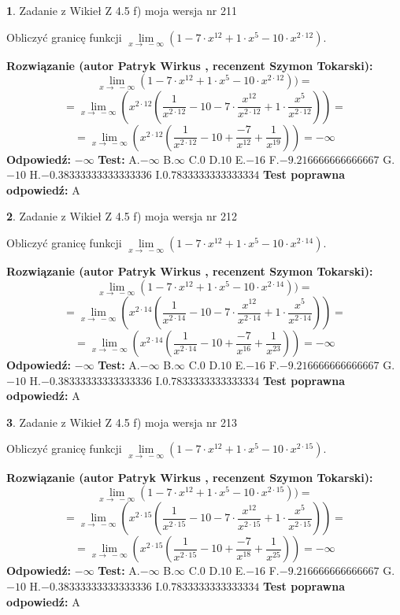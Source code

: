 \documentclass[12pt, a4paper]{article}
\theoremstyle{definition} %
\newtheorem{zad}{}
\newcommand{\zadStart}[1]{\begin{zad}#1\newline}
\newcommand{\zadStop}{\end{zad}}
\newcommand{\rozwStart}[2]{\noindent \textbf{Rozwiązanie (autor #1 , recenzent #2): }\newline}
\newcommand{\rozwStop}{\newline}
\newcommand{\odpStart}{\noindent \textbf{Odpowiedź:}\newline}
\newcommand{\odpStop}{\newline}
\newcommand{\testStart}{\noindent \textbf{Test:}\newline}
\newcommand{\testStop}{\newline}
\newcommand{\kluczStart}{\noindent \textbf{Test poprawna odpowiedź:}\newline}
\newcommand{\kluczStop}{\newline}
\begin{document}
\zadStart{Zadanie z Wikieł Z 4.5 f) moja wersja nr 211}


Obliczyć granicę funkcji  $\lim\limits_{x\to\ -\infty}(1 - 7 \cdot x^{12}+1 \cdot x^{5}- 10 \cdot x^{2\cdot12})$.
\zadStop
\rozwStart{Patryk Wirkus}{Szymon Tokarski}
$$\lim\limits_{x\to\ -\infty}(1 - 7 \cdot x^{12}+1 \cdot x^{5}- 10 \cdot x^{2\cdot12}))=$$
$$=\lim\limits_{x\to\ -\infty}(x^{2\cdot12}(\frac{1}{x^{2\cdot12}}-10 -7 \cdot \frac{x^{12}}{x^{2\cdot12}}+1 \cdot \frac{x^{5}}{x^{2\cdot12}}))=$$
$$=\lim\limits_{x\to\ -\infty}(x^{2\cdot12}(\frac{1}{x^{2\cdot12}}-10 + \frac{-7}{x^{12}}+ \frac{1}{x^{19}}))=-\infty$$
\rozwStop
\odpStart
$-\infty$
\odpStop
\testStart
A.$-\infty$ B.$\infty$ C.$0$ D.$10$ E.$-16$
F.$-9.216666666666667$ G.$-10$
H.$-0.38333333333333336$
I.$0.7833333333333334$
\testStop
\kluczStart
A
\kluczStop



\zadStart{Zadanie z Wikieł Z 4.5 f) moja wersja nr 212}


Obliczyć granicę funkcji  $\lim\limits_{x\to\ -\infty}(1 - 7 \cdot x^{12}+1 \cdot x^{5}- 10 \cdot x^{2\cdot14})$.
\zadStop
\rozwStart{Patryk Wirkus}{Szymon Tokarski}
$$\lim\limits_{x\to\ -\infty}(1 - 7 \cdot x^{12}+1 \cdot x^{5}- 10 \cdot x^{2\cdot14}))=$$
$$=\lim\limits_{x\to\ -\infty}(x^{2\cdot14}(\frac{1}{x^{2\cdot14}}-10 -7 \cdot \frac{x^{12}}{x^{2\cdot14}}+1 \cdot \frac{x^{5}}{x^{2\cdot14}}))=$$
$$=\lim\limits_{x\to\ -\infty}(x^{2\cdot14}(\frac{1}{x^{2\cdot14}}-10 + \frac{-7}{x^{16}}+ \frac{1}{x^{23}}))=-\infty$$
\rozwStop
\odpStart
$-\infty$
\odpStop
\testStart
A.$-\infty$ B.$\infty$ C.$0$ D.$10$ E.$-16$
F.$-9.216666666666667$ G.$-10$
H.$-0.38333333333333336$
I.$0.7833333333333334$
\testStop
\kluczStart
A
\kluczStop



\zadStart{Zadanie z Wikieł Z 4.5 f) moja wersja nr 213}


Obliczyć granicę funkcji  $\lim\limits_{x\to\ -\infty}(1 - 7 \cdot x^{12}+1 \cdot x^{5}- 10 \cdot x^{2\cdot15})$.
\zadStop
\rozwStart{Patryk Wirkus}{Szymon Tokarski}
$$\lim\limits_{x\to\ -\infty}(1 - 7 \cdot x^{12}+1 \cdot x^{5}- 10 \cdot x^{2\cdot15}))=$$
$$=\lim\limits_{x\to\ -\infty}(x^{2\cdot15}(\frac{1}{x^{2\cdot15}}-10 -7 \cdot \frac{x^{12}}{x^{2\cdot15}}+1 \cdot \frac{x^{5}}{x^{2\cdot15}}))=$$
$$=\lim\limits_{x\to\ -\infty}(x^{2\cdot15}(\frac{1}{x^{2\cdot15}}-10 + \frac{-7}{x^{18}}+ \frac{1}{x^{25}}))=-\infty$$
\rozwStop
\odpStart
$-\infty$
\odpStop
\testStart
A.$-\infty$ B.$\infty$ C.$0$ D.$10$ E.$-16$
F.$-9.216666666666667$ G.$-10$
H.$-0.38333333333333336$
I.$0.7833333333333334$
\testStop
\kluczStart
A
\kluczStop
\end{document}
